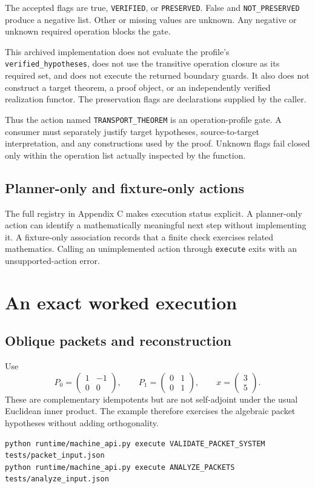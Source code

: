 \documentclass[a4paper,11pt]{article}
\begin{document}
The accepted flags are true, \nolinkurl{VERIFIED}, or \nolinkurl{PRESERVED}. False and \nolinkurl{NOT_PRESERVED} produce a negative list. Other or missing values are unknown. Any negative or unknown required operation blocks the gate.

This archived implementation does not evaluate the profile's \nolinkurl{verified_hypotheses}, does not use the transitive operation closure as its required set, and does not execute the returned boundary guards. It also does not construct a target theorem, a proof object, or an independently verified realization functor. The preservation flags are declarations supplied by the caller.

Thus the action named \nolinkurl{TRANSPORT_THEOREM} is an operation-profile gate. A consumer must separately justify target hypotheses, source-to-target interpretation, and any constructions used by the proof. Unknown flags fail closed only within the operation list actually inspected by the function.
\subsection{Planner-only and fixture-only actions}
The full registry in Appendix C makes execution status explicit. A planner-only action can identify a mathematically meaningful next step without implementing it. A fixture-only association records that a finite check exercises related mathematics. Calling an unimplemented action through \nolinkurl{execute} exits with an unsupported-action error.

\section{An exact worked execution}
\subsection{Oblique packets and reconstruction}
Use
\[
P_0=\begin{pmatrix}1&-1\\0&0\end{pmatrix},\qquad
P_1=\begin{pmatrix}0&1\\0&1\end{pmatrix},\qquad
x=\begin{pmatrix}3\\5\end{pmatrix}.
\]
These are complementary idempotents but are not self-adjoint under the usual Euclidean inner product. The example therefore exercises the algebraic packet hypotheses without adding orthogonality.
\begin{lstlisting}
python runtime/machine_api.py execute VALIDATE_PACKET_SYSTEM tests/packet_input.json
python runtime/machine_api.py execute ANALYZE_PACKETS tests/analyze_input.json
\end{lstlisting}
\end{document}
